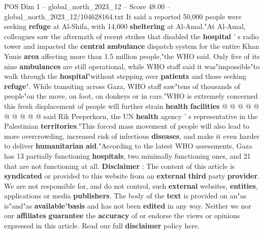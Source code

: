 \begin{textsample}{POS Dim 1 – global\_north\_2023\_12 – Score 48.00 – global\_north\_2023\_12/104628164.txt}
It said a reported 50,000 people were seeking \textbf{refuge} at Al-Shifa, with 14,000 \textbf{sheltering} at Al-Amal."At Al-Amal, colleagues saw the aftermath of recent strikes that disabled the \textbf{hospital} ' s radio tower and impacted the \textbf{central} \textbf{ambulance} dispatch system for the entire Khan Yunis \textbf{area} affecting more than 1.5 million people,"the WHO said.
Only five of its nine \textbf{ambulances} are still operational, while WHO staff said it was"impossible"to walk through the \textbf{hospital}"without stepping over \textbf{patients} and those seeking \textbf{refuge}".
While transiting across Gaza, WHO staff saw"tens of thousands of people"on the move, on foot, on donkeys or in cars."WHO is extremely concerned this fresh displacement of people will further strain \textbf{health} \textbf{facilities} @ @ @ @ @ @ @ @ @ @ said Rik Peeperkorn, the UN \textbf{health} agency ' s representative in the Palestinian \textbf{territories}."This forced mass movement of people will also lead to more overcrowding, increased risk of infectious \textbf{diseases}, and make it even harder to deliver \textbf{humanitarian} \textbf{aid}."According to the latest WHO assessments, Gaza has 13 partially functioning \textbf{hospitals}, two minimally functioning ones, and 21 that are not functioning at all. \textbf{Disclaimer} : The content of this article is \textbf{syndicated} or provided to this website from an \textbf{external} \textbf{third} party \textbf{provider}.
We are not responsible for, and do not control, such \textbf{external} websites, \textbf{entities}, applications or media \textbf{publishers}.
The body of the \textbf{text} is provided on an"as is"and"as \textbf{available}"\textbf{basis} and has not been \textbf{edited} in any way.
Neither we nor our \textbf{affiliates} \textbf{guarantee} the \textbf{accuracy} of or endorse the views or opinions expressed in this article.
Read our full \textbf{disclaimer} policy here.

\end{textsample}

